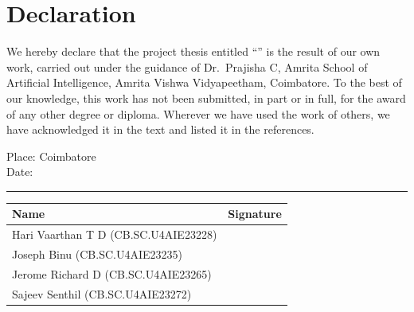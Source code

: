 \chapter*{Declaration}

We hereby declare that the project thesis entitled ``\projecttitle'' is the result of our own work, carried out under the guidance of Dr.\ Prajisha C, Amrita School of Artificial Intelligence, Amrita Vishwa Vidyapeetham, Coimbatore. To the best of our knowledge, this work has not been submitted, in part or in full, for the award of any other degree or diploma. Wherever we have used the work of others, we have acknowledged it in the text and listed it in the references.

\vspace{0.5in}
\noindent Place: Coimbatore \\
Date: \rule{1.8in}{0.4pt}

\vspace{0.5in}
\begin{center}
\renewcommand{\arraystretch}{2.2}
\begin{tabular}{p{3.2in}p{2.2in}}
\toprule
\textbf{Name} & \textbf{Signature} \\
\midrule
Hari Vaarthan T D (CB.SC.U4AIE23228) & \\
Joseph Binu (CB.SC.U4AIE23235) & \\
Jerome Richard D (CB.SC.U4AIE23265) & \\
Sajeev Senthil (CB.SC.U4AIE23272) & \\
\bottomrule
\end{tabular}
\end{center}
